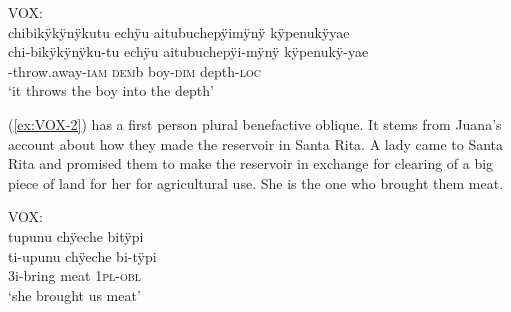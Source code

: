 \ea\label{ex:VOX-1}
\begingl
\glpreamble \textup{VOX:}\\chibikÿkÿnÿkutu echÿu aitubuchepÿimÿnÿ kÿpenukÿyae\\
\gla chi-bikÿkÿnÿku-tu echÿu aitubuchepÿi-mÿnÿ kÿpenukÿ-yae\\
-throw.away-\textsc{iam} \textsc{dem}b boy-\textsc{dim} depth-\textsc{loc}\\
\glft ‘it throws the boy into the depth’
\endgl
\trailingcitation{[mox-a110920l-2.153]}
\xe

(\ref{ex:VOX-2}) has a first person plural benefactive oblique. It stems from Juana’s account about how they made the reservoir in Santa Rita. A lady came to Santa Rita and promised them to make the reservoir in exchange for clearing of a big piece of land for her for agricultural use. She is the one who brought them meat.


\ea\label{ex:VOX-2}
\begingl
\glpreamble \textup{VOX:}\\tupunu chÿeche bitÿpi\\
\gla ti-upunu chÿeche bi-tÿpi\\
\glb 3i-bring meat 1\textsc{pl}-\textsc{obl}\\
\glft ‘she brought us meat’
\endgl
\trailingcitation{[jxx-p120515l-2.098]}
\xe


%
%

%

